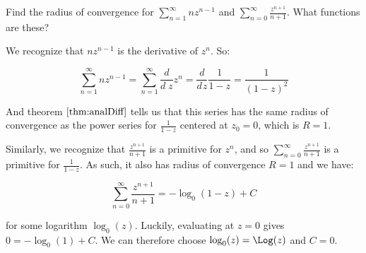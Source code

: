 \begin{ex}{}{} Find the radius of convergence for $\sum_{n = 1}^\infty nz^{n-1}$ and $\sum_{n = 0}^\infty \frac{z^{n+1}}{n+1}$. What functions are these?

We recognize that $nz^{n-1}$ is the derivative of $z^n$. So:

$$\sum_{n = 1}^\infty nz^{n-1} = \sum_{n = 1}^\infty \frac{d}{d\;z}z^n = \frac{d}{d\hspace{1pt}z}\frac{1}{1-z} = \frac{1}{(1-z)^2}$$

And theorem $\ref{thm:analDiff}$ tells us that this series has the same radius of convergence as the power series for $\frac{1}{1-z}$ centered at $z_0 = 0$, which is $R = 1$.

Similarly, we recognize that $\frac{z^{n+1}}{n+1}$ is a primitive for $z^n$, and so $\sum_{n = 0}^\infty \frac{z^{n+1}}{n+1}$ is a primitive for $\frac{1}{1-z}$. As such, it also has radius of convergence $R = 1$ and we have:

$$\sum_{n = 0}^\infty \frac{z^{n+1}}{n+1} = -\log_0(1-z) + C$$

\noin for some logarithm $\log_0(z)$. Luckily, evaluating at $z = 0$ gives $0 = -\log_0(1) + C$. We can therefore choose $\log_0(z) = \Log(z)$ and $C = 0$.
\end{ex}

